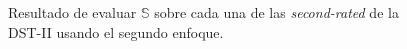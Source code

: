 \begin{figure}
	\centering
	\caption{Resultado de evaluar $\mathbb{S}$ sobre cada una de las \textit{second-rated} de la DST-II usando el segundo enfoque.} \label{fig:gaussian-example-approach2}
\end{figure}

